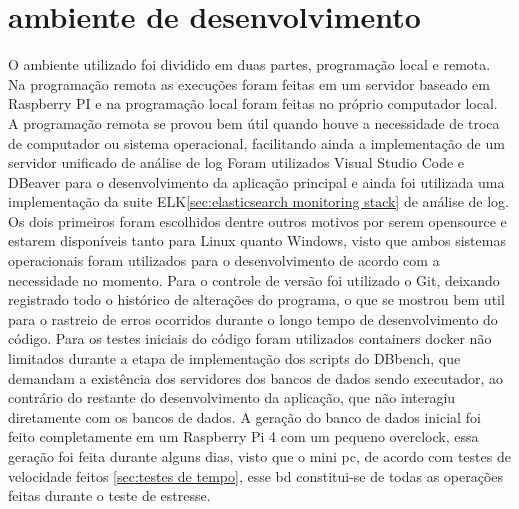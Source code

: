 \documentclass[
	12pt,				%
	openright,			%
	oneside,			%
	a4paper,			%
	english,			%
	french,				%
	spanish,			%
	brazil,				%
	]{abntex2}
\begin{document}
\section{ambiente de desenvolvimento}
\label{sec:ambiente de desenvolvimento}
O ambiente utilizado foi dividido em duas partes, programação local e remota. Na programação remota as execuções foram feitas em um servidor baseado em Raspberry PI e na programação local foram feitas no próprio computador local. A programação remota se provou bem útil quando houve a necessidade de troca de computador ou sistema operacional, facilitando ainda a implementação de um servidor unificado de análise de log\newline
Foram utilizados Visual Studio Code e DBeaver para o desenvolvimento da aplicação principal e ainda foi utilizada uma implementação da suite ELK\autoref{sec:elasticsearch monitoring stack} de análise de log. Os dois primeiros foram escolhidos dentre outros motivos por serem opensource e estarem disponíveis tanto para Linux quanto Windows, visto que ambos sistemas operacionais foram utilizados para o desenvolvimento de acordo com a necessidade no momento.\newline
Para o controle de versão foi utilizado o Git, deixando registrado todo o histórico de alterações do programa, o que se mostrou bem util para o rastreio de erros ocorridos durante o longo tempo de desenvolvimento do código.\newline
Para os testes iniciais do código foram utilizados containers docker não limitados durante a etapa de implementação dos scripts do DBbench, que demandam a existência dos servidores dos bancos de dados sendo executador, ao contrário do restante do desenvolvimento da aplicação, que não interagiu diretamente com os bancos de dados.\newline
A geração do banco de dados inicial foi feito completamente em um Raspberry Pi 4 com um pequeno overclock, essa geração foi feita durante alguns dias, visto que o mini pc, de acordo com testes de velocidade feitos \autoref{sec:testes de tempo}, esse bd constitui-se de todas as operações feitas durante o teste de estresse.
\end{document}
